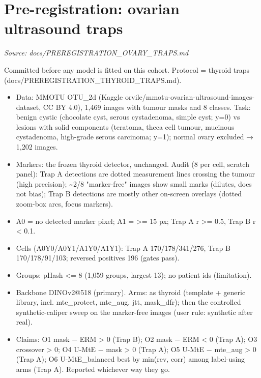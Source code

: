 \section{Pre-registration: ovarian ultrasound traps}\label{doc:PREREGISTRATION_OVARY_TRAPS}
\noindent\textit{Source: docs/PREREGISTRATION\_OVARY\_TRAPS.md}

{\small
Committed before any model is fitted on this cohort. Protocol = thyroid traps (docs/PREREGISTRATION\_THYROID\_TRAPS.md).

\begin{itemize}

\item
  Data: MMOTU OTU\_2d (Kaggle orvile/mmotu-ovarian-ultrasound-images-dataset, CC BY 4.0), 1,469 images with tumour
  masks and 8 classes. Task: benign cystic (chocolate cyst, serous cystadenoma, simple cyst; y=0) vs lesions with
  solid components (teratoma, theca cell tumour, mucinous cystadenoma, high-grade serous carcinoma; y=1); normal
  ovary excluded → 1,202 images.
\item
  Markers: the frozen thyroid detector, unchanged. Audit (8 per cell, scratch panel): Trap A detections are dotted
  measurement lines crossing the tumour (high precision); \textasciitilde2/8 "marker-free" images show small marks (dilutes, does
  not bias); Trap B detections are mostly other on-screen overlays (dotted zoom-box arcs, focus markers).
\item
  A0 = no detected marker pixel; A1 = \textgreater= 15 px; Trap A r \textgreater= 0.5, Trap B r \textless{} 0.1.
\item
  Cells (A0Y0/A0Y1/A1Y0/A1Y1): Trap A 170/178/341/276, Trap B 170/178/91/103; reversed positives 196 (gates pass).
\item
  Groups: pHash \textless= 8 (1,059 groups, largest 13); no patient ids (limitation).
\item
  Backbone DINOv2@518 (primary). Arms: as thyroid (template + generic library, incl. mte\_protect, mte\_aug, jtt,
  mask\_dfr); then the controlled synthetic-caliper sweep on the marker-free images (user rule: synthetic after real).
\item
  Claims: O1 mask − ERM \textgreater{} 0 (Trap B); O2 mask − ERM \textless{} 0 (Trap A); O3 crossover \textgreater{} 0; O4 U-MtE − mask \textgreater{} 0 (Trap A);
  O5 U-MtE − mte\_aug \textgreater{} 0 (Trap A); O6 U-MtE\_balanced best by min(rev, corr) among label-using arms (Trap A).
  Reported whichever way they go.
\end{itemize}

}
